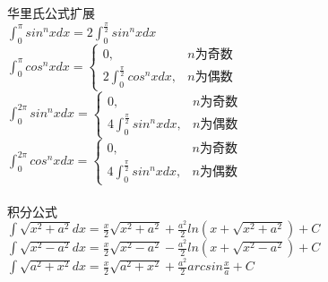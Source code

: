 \documentclass{article}
\begin{document}
\begin{flushleft}
	华里氏公式扩展\\
	$\int_{0}^{\pi}sin^nxdx=2\int_{0}^{\frac{\pi}{2}}sin^nxdx$\\
	$\int_{0}^{\pi}cos^nxdx=\left\{
	\begin{array}{lcl}
	0, & n\mbox{为奇数}\\
	2\int_{0}^{\frac{\pi}{2}}cos^nxdx, & n\mbox{为偶数}
	\end{array} \right.$\\
	$\int_{0}^{2\pi}sin^nxdx=\left\{
	\begin{array}{lcl}
	0, & n\mbox{为奇数}\\
	4\int_{0}^{\frac{\pi}{2}}sin^nxdx, & n\mbox{为偶数}
	\end{array} \right.$\\
	$\int_{0}^{2\pi}cos^nxdx=\left\{
	\begin{array}{lcl}
	0, & n\mbox{为奇数}\\
	4\int_{0}^{\frac{\pi}{2}}sin^nxdx, & n\mbox{为偶数}
	\end{array} \right.$\\
	~\\
	积分公式\\
	$\int \sqrt{x^2+a^2}dx=\frac{x}{2}\sqrt{x^2+a^2}+\frac{a^2}{2}ln(x+\sqrt{x^2+a^2})+C$\\
	$\int \sqrt{x^2-a^2}dx=\frac{x}{2}\sqrt{x^2-a^2}-\frac{a^2}{2}ln(x+\sqrt{x^2-a^2})+C$\\
	$\int \sqrt{a^2+x^2}dx=\frac{x}{2}\sqrt{a^2+x^2}+\frac{a^2}{2}arcsin\frac{x}{a}+C$\\
	
\end{flushleft}
\end{document}
